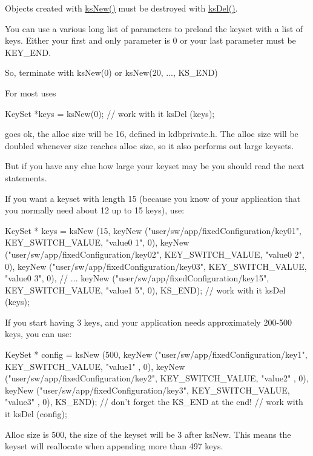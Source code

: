 Objects created with \hyperlink{group__keyset_ga671e1aaee3ae9dc13b4834a4ddbd2c3c}{ksNew()} must be destroyed with \hyperlink{group__keyset_ga27e5c16473b02a422238c8d970db7ac8}{ksDel()}.

You can use a various long list of parameters to preload the keyset with a list of keys. Either your first and only parameter is 0 or your last parameter must be KEY\_\-END.

So, terminate with ksNew(0) or ksNew(20, ..., KS\_\-END)

For most uses 
\begin{DoxyCode}
KeySet *keys = ksNew(0);
// work with it
ksDel (keys);
\end{DoxyCode}
 goes ok, the alloc size will be 16, defined in kdbprivate.h. The alloc size will be doubled whenever size reaches alloc size, so it also performs out large keysets.

But if you have any clue how large your keyset may be you should read the next statements.

If you want a keyset with length 15 (because you know of your application that you normally need about 12 up to 15 keys), use: 
\begin{DoxyCode}
KeySet * keys = ksNew (15,
        keyNew ("user/sw/app/fixedConfiguration/key01", KEY_SWITCH_VALUE, "value0
      1", 0),
        keyNew ("user/sw/app/fixedConfiguration/key02", KEY_SWITCH_VALUE, "value0
      2", 0),
        keyNew ("user/sw/app/fixedConfiguration/key03", KEY_SWITCH_VALUE, "value0
      3", 0),
        // ...
        keyNew ("user/sw/app/fixedConfiguration/key15", KEY_SWITCH_VALUE, "value1
      5", 0),
        KS_END);
// work with it
ksDel (keys);
\end{DoxyCode}


If you start having 3 keys, and your application needs approximately 200-\/500 keys, you can use: 
\begin{DoxyCode}
KeySet * config = ksNew (500,
        keyNew ("user/sw/app/fixedConfiguration/key1", KEY_SWITCH_VALUE, "value1"
      , 0),
        keyNew ("user/sw/app/fixedConfiguration/key2", KEY_SWITCH_VALUE, "value2"
      , 0),
        keyNew ("user/sw/app/fixedConfiguration/key3", KEY_SWITCH_VALUE, "value3"
      , 0),
        KS_END); // don't forget the KS_END at the end!
// work with it
ksDel (config);
\end{DoxyCode}
 Alloc size is 500, the size of the keyset will be 3 after ksNew. This means the keyset will reallocate when appending more than 497 keys.


